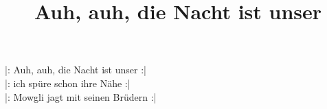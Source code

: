 \title{Auh, auh, die Nacht ist unser} 

|: Auh, auh, die Nacht ist unser :| \\ 
|: ich spüre schon ihre Nähe :| \\ 
|: Mowgli jagt mit seinen Brüdern :|

